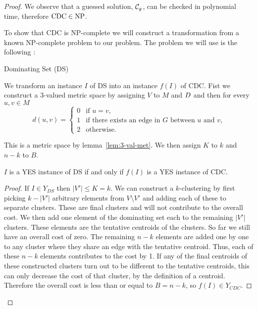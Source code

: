 \begin{proof}
  We observe that a guessed solution, $\mathcal{C}_g$, can be checked in polynomial
  time, therefore $\text{CDC} \in \text{NP}$.

  To show that CDC is NP-complete we will construct a transformation from a
  known NP-complete problem to our problem.  The problem we will use is the
  following \cite{gareyjohnson79}:
  \begin{problem}{Dominating Set (DS)}
  \end{problem}

  We transform an instance $I$ of DS into an instance $f(I)$ of CDC.  Fist we
  construct a 3-valued metric space by assigning $V$ to $M$ and $D$ and
  then for every $u,v \in M$
  \begin{equation*}
    d(u,v) = \begin{cases}
      0 & \text{if $u=v$,}\\
      1 & \text{if there exists an edge in $G$ between $u$ and $v$,}\\
      2 & \text{otherwise.}
    \end{cases}
  \end{equation*}

  This is a metric space by lemma~\ref{lem:3-val-met}. We then assign $K$ to
  $k$ and $n-k$ to $B$.

  \begin{lem}
    \label{lem:iff}
    $I$ is a YES instance of DS if and only if $f(I)$ is a YES instance of CDC.
  \end{lem}

  \begin{proof}
    If $I \in Y_{DS}$ then $|V'| \leq K = k$.  We can construct a
    $k$-clustering by first picking $k-|V'|$ arbitrary elements from $V
    \setminus V'$ and adding each of these to separate clusters.  These are
    final clusters and will not contribute to the overall cost.  We then add
    one element of the dominating set each to the remaining $|V'|$ clusters.
    These elements are the tentative centroids of the clusters.  So far we
    still have an overall cost of zero.  The remaining $n-k$ elements are
    added one by one to any cluster where they share an edge with the
    tentative centroid.  Thus, each of these $n-k$ elements contributes to the
    cost by 1.  If any of the final centroids of these constructed clusters
    turn out to be different to the tentative centroids, this can only
    decrease the cost of that cluster, by the definition of a centroid.
    Therefore the overall cost is less than or equal to $B = n-k$, so $f(I)
    \in Y_{CDC}$.


\end{proof}
\end{proof}
